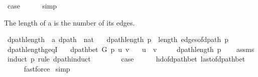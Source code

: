 \begin{isabellebody}
\ {\isacharquery}{\kern0pt}case\isanewline
\ \ \ \ \isamarkupfalse%
\ simp\isanewline
{}\isamarkupfalse%
%
\endisatagproof
{\isafoldproof}%
%
\isadelimproof
%
\endisadelimproof
%
\begin{isamarkuptext}%
The length of a  is the number of its edges.%
\end{isamarkuptext}\isamarkuptrue%
\isamarkupfalse%
\ dpath{\isacharunderscore}{\kern0pt}length\ {\isacharcolon}{\kern0pt}{\isacharcolon}{\kern0pt}\ {\isachardoublequoteopen}{\isacharprime}{\kern0pt}a\ dpath\ {\isasymRightarrow}\ nat{\isachardoublequoteclose}\ \isanewline
\ \ {\isachardoublequoteopen}dpath{\isacharunderscore}{\kern0pt}length\ p\ {\isasymequiv}\ length\ {\isacharparenleft}{\kern0pt}edges{\isacharunderscore}{\kern0pt}of{\isacharunderscore}{\kern0pt}dpath\ p{\isacharparenright}{\kern0pt}{\isachardoublequoteclose}\isanewline
%
\isadeliminvisible
\isanewline
%
\endisadeliminvisible
%
\isataginvisible
{}\isamarkupfalse%
\ dpath{\isacharunderscore}{\kern0pt}length{\isacharunderscore}{\kern0pt}geq{\isacharunderscore}{\kern0pt}{}I{\isacharcolon}{\kern0pt}\isanewline
\ \ \ {\isachardoublequoteopen}dpath{\isacharunderscore}{\kern0pt}bet\ G\ p\ u\ v{\isachardoublequoteclose}\isanewline
\ \ \ {\isachardoublequoteopen}u\ {\isasymnoteq}\ v{\isachardoublequoteclose}\isanewline
\ \ \ {\isachardoublequoteopen}{}\ {\isasymle}\ dpath{\isacharunderscore}{\kern0pt}length\ p{\isachardoublequoteclose}%
\endisataginvisible
{\isafoldinvisible}%
%
\isadeliminvisible
\isanewline
%
\endisadeliminvisible
%
\isadelimproof
\ \ %
\endisadelimproof
%
\isatagproof
{}\isamarkupfalse%
\ assms\isanewline
{}\isamarkupfalse%
\ {\isacharparenleft}{\kern0pt}induct\ p\ rule{\isacharcolon}{\kern0pt}\ dpath{\isacharunderscore}{\kern0pt}induct{\isacharparenright}{\kern0pt}\isanewline
\ \ \isamarkupfalse%
\ {}\isanewline
\ \ \isamarkupfalse%
\ {\isacharquery}{\kern0pt}case\isanewline
\ \ \ \ \isamarkupfalse%
\ hd{\isacharunderscore}{\kern0pt}of{\isacharunderscore}{\kern0pt}dpath{\isacharunderscore}{\kern0pt}bet{\isacharprime}{\kern0pt}\ last{\isacharunderscore}{\kern0pt}of{\isacharunderscore}{\kern0pt}dpath{\isacharunderscore}{\kern0pt}bet\isanewline
\ \ \ \ \isamarkupfalse%
\ fastforce\isanewline
{}\isamarkupfalse%
\ simp{\isacharplus}{\kern0pt}%
\endisatagproof

\end{isabellebody}
